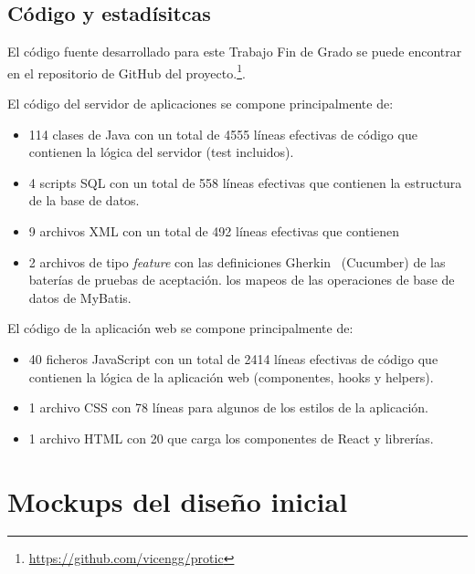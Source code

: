 \documentclass[a4paper, 12pt]{book}
\begin{document}
    \section{Código y estadísitcas}
    \label{sec:code_and_statistics}

    El código fuente desarrollado para este Trabajo Fin de Grado se puede encontrar en el
    repositorio de GitHub del proyecto.\footnote{\url{https://github.com/vicengg/protic}}.

    El código del servidor de aplicaciones se compone principalmente de:
    \begin{itemize}
        \item 114 clases de Java con un total de 4555 líneas efectivas de código que contienen la lógica del servidor (test incluidos).
        \item 4 scripts SQL con un total de 558 líneas efectivas que contienen la estructura de la base de datos.
        \item 9 archivos XML con un total de 492 líneas efectivas que contienen
        \item 2 archivos de tipo \emph{feature} con las definiciones Gherkin~\cite{bib:gherkin} (Cucumber) de las baterías de pruebas de aceptación.
        los mapeos de las operaciones de base de datos de MyBatis.
    \end{itemize}

    El código de la aplicación web se compone principalmente de:
    \begin{itemize}
        \item 40 ficheros JavaScript con un total de 2414 líneas efectivas de código que contienen la lógica de la aplicación web (componentes, hooks y helpers).
        \item 1 archivo CSS con 78 líneas para algunos de los estilos de la aplicación.
        \item 1 archivo HTML con 20 que carga los componentes de React y librerías.
    \end{itemize}



    \cleardoublepage
    \appendix


    \chapter{Mockups del diseño inicial}
    \label{app:mockups}
\end{document}
